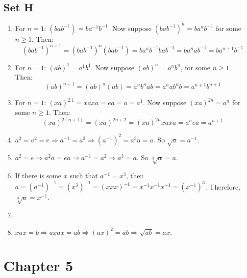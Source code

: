 \documentclass{article}
\begin{document}
\subsection*{Set H}
\begin{enumerate}
    \item For $n = 1$: $(bab^{-1}) = ba^{-1}b^{-1}$. Now suppose $(bab^{-1})^{n} = ba^nb^{-1}$ for some $n \geqslant 1$. Then:
        $$(bab^{-1})^{n + 1} = (bab^{-1})^{n}(bab^{-1}) = ba^{n}b^{-1}bab^{-1} = ba^nab^{-1} = ba^{n + 1}b^{-1}$$
    \item For $n = 1$: $(ab)^1 = a^1b^1$. Now suppose $(ab)^n = a^nb^n$, for some $n \geqslant 1$. Then:
        $$(ab)^{n + 1} = (ab)^n(ab) = a^nb^nab = a^nab^nb = a^{n + 1}b^{n + 1}$$
    \item For $n = 1$: $(xa)^{2.1} = xaxa = ea = a = a^1$. Now suppose $(xa)^{2n} = a^n$ for some $n \geqslant 1$. Then:
        $$(xa)^{2(n + 1)} = (xa)^{2n + 2} = (xa)^{2n}xaxa = a^nea = a^{n + 1}$$
    \item $a^3 = a^2 = e \Rightarrow a^{-1} = a^2 \Rightarrow (a^{-1})^2 = a^3a = a$. So $\sqrt{a} = a^{-1}$.
    \item $a^2 = e \Rightarrow a^2a = ea \Rightarrow a^{-1} = a^2 \Rightarrow a^3 = a$. So $\sqrt[3]{a} = a$.
    \item If there is some $x$ such that $a^{-1} = x^3$, then $a = (a^{-1})^{-1} = (x^3)^{-1} = (xxx)^{-1} = x^{-1}x^{-1}x^{-1} = (x^{-1})^3$. Therefore, $\sqrt[3]{a} = x^{-1}$.
    \item 
    \item $xax = b \Rightarrow axax = ab \Rightarrow (ax)^2 = ab \Rightarrow \sqrt{ab} = ax$.
\end{enumerate}

\section*{Chapter 5}
\end{document}
